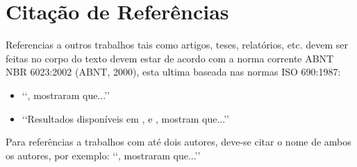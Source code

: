\section{Citação de Referências}
Referencias a outros trabalhos tais como artigos, teses, relatórios, etc. devem
ser feitas no corpo do texto devem estar de acordo com a norma corrente ABNT
NBR 6023:2002 (ABNT, 2000), esta ultima baseada nas normas ISO 690:1987:
\begin{itemize}
\item \lq\lq \cite{bordalo1989}, mostraram que...\rq\rq
\item \lq\lq Resultados disponíveis em \cite{coimbra1978}, \cite{clark1986}
e \cite{sparrow1980}, mostram que...\rq\rq
\end{itemize}
Para referências a trabalhos com até dois autores, deve-se citar o nome de
ambos os autores, por exemplo: \lq\lq \cite{soviero1997}, mostraram
que...\rq\rq
